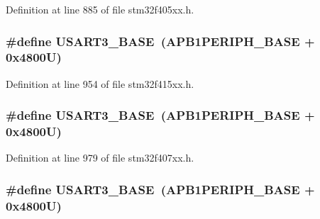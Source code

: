 Definition at line 885 of file stm32f405xx.\+h.

\subsubsection[{\texorpdfstring{U\+S\+A\+R\+T3\+\_\+\+B\+A\+SE}{USART3_BASE}}]{\setlength{\rightskip}{0pt plus 5cm}\#define U\+S\+A\+R\+T3\+\_\+\+B\+A\+SE~({\bf A\+P\+B1\+P\+E\+R\+I\+P\+H\+\_\+\+B\+A\+SE} + 0x4800\+U)}\hypertarget{group___peripheral__registers__structures_gabe0d6539ac0026d598274ee7f45b0251}{}\label{group___peripheral__registers__structures_gabe0d6539ac0026d598274ee7f45b0251}


Definition at line 954 of file stm32f415xx.\+h.

\subsubsection[{\texorpdfstring{U\+S\+A\+R\+T3\+\_\+\+B\+A\+SE}{USART3_BASE}}]{\setlength{\rightskip}{0pt plus 5cm}\#define U\+S\+A\+R\+T3\+\_\+\+B\+A\+SE~({\bf A\+P\+B1\+P\+E\+R\+I\+P\+H\+\_\+\+B\+A\+SE} + 0x4800\+U)}\hypertarget{group___peripheral__registers__structures_gabe0d6539ac0026d598274ee7f45b0251}{}\label{group___peripheral__registers__structures_gabe0d6539ac0026d598274ee7f45b0251}


Definition at line 979 of file stm32f407xx.\+h.

\subsubsection[{\texorpdfstring{U\+S\+A\+R\+T3\+\_\+\+B\+A\+SE}{USART3_BASE}}]{\setlength{\rightskip}{0pt plus 5cm}\#define U\+S\+A\+R\+T3\+\_\+\+B\+A\+SE~({\bf A\+P\+B1\+P\+E\+R\+I\+P\+H\+\_\+\+B\+A\+SE} + 0x4800\+U)}\hypertarget{group___peripheral__registers__structures_gabe0d6539ac0026d598274ee7f45b0251}{}\label{group___peripheral__registers__structures_gabe0d6539ac0026d598274ee7f45b0251}


